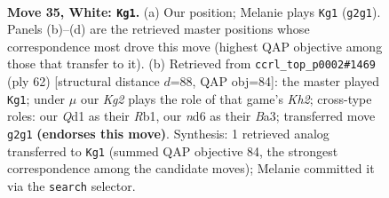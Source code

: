 \documentclass[11pt]{article}
\begin{document}
\clearpage

\begin{figure}[p]\centering
\begin{subfigure}{0.46\textwidth}\centering
\resizebox{\linewidth}{!}{%
\newchessgame
\chessboard[
  setfen={1rb2k2/1p5p/r2n4/2R3p1/N3q3/4P1P1/P4PKP/B2QR3 w - - 5 35},
  showmover=false,
  pgfstyle=straightmove, color=movearrow, markmove={g2-g1}
]}
\caption{}
\end{subfigure}\hfill
\begin{subfigure}{0.46\textwidth}\centering
\resizebox{\linewidth}{!}{%
\newchessgame
\chessboard[
  setfen={r1b1r3/1pp3k1/6n1/p3p1Np/P6q/BPQP4/2P3RK/1R6 w - - 0 32},
  showmover=false,
  pgfstyle=straightmove, color=movearrow, markmove={h2-g1}
]}
\caption{}
\end{subfigure}
\\[4pt]

\caption{\textbf{Move 35, White: \texttt{Kg1}.} (a) Our position; Melanie plays \texttt{Kg1} (\texttt{g2g1}). Panels (b)--(d) are the retrieved master positions whose correspondence most drove this move (highest QAP objective among those that transfer to it). (b) Retrieved from \texttt{ccrl\_top\_p0002\#1469} (ply 62) [structural distance $d$=88, QAP obj=84]: the master played \texttt{Kg1}; under $\mu$ our \emph{Kg2} plays the role of that game's \emph{Kh2}; cross-type roles: our \emph{Q}d1 as their \emph{R}b1, our \emph{n}d6 as their \emph{B}a3; transferred move \texttt{g2g1} \textbf{(endorses this move)}. Synthesis: 1 retrieved analog transferred to \texttt{Kg1} (summed QAP objective 84, the strongest correspondence among the candidate moves); Melanie committed it via the \texttt{search} selector.}
\label{fig:thought-m68}
\end{figure}

\clearpage
\end{document}
